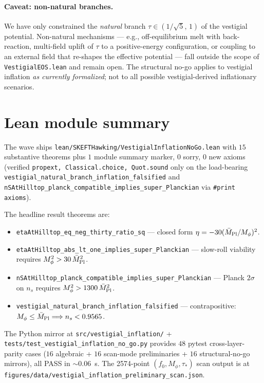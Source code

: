 \documentclass[twocolumn]{revtex4-2}
\newcommand{\Mpl}{\bar M_{\rm Pl}}
\newcommand{\Mphi}{M_\phi}
\newcommand{\fzero}{f_0}
\newcommand{\nS}{n_s}
\begin{document}
\paragraph{Caveat: non-natural branches.} We have only constrained the
\emph{natural} branch $\tau\in(1/\sqrt{5},\,1)$ of the vestigial
potential. Non-natural mechanisms — e.g., off-equilibrium melt with
back-reaction, multi-field uplift of $\tau$ to a positive-energy
configuration, or coupling to an external field that re-shapes the
effective potential — fall outside the scope of \texttt{VestigialEOS.lean}
and remain open. The structural no-go applies to vestigial inflation
\emph{as currently formalized}; not to all possible
vestigial-derived inflationary scenarios.

\section{Lean module summary}
\label{sec:lean}

The wave ships \texttt{lean/SKEFTHawking/VestigialInflationNoGo.lean}
with $15$ substantive theorems plus $1$ module summary marker, $0$
sorry, $0$ new axioms (verified \texttt{propext, Classical.choice,
Quot.sound} only on the load-bearing
\texttt{vestigial\_natural\_branch\_inflation\_falsified} and
\texttt{nSAtHilltop\_planck\_compatible\_implies\_super\_Planckian}
via \texttt{\#print axioms}).

The headline result theorems are:
\begin{itemize}
\item \texttt{etaAtHilltop\_eq\_neg\_thirty\_ratio\_sq} — closed form
   $\eta = -30(\Mpl/\Mphi)^2$.
\item \texttt{etaAtHilltop\_abs\_lt\_one\_implies\_super\_Planckian} —
   slow-roll viability requires $\Mphi^2 > 30\,\Mpl^2$.
\item \texttt{nSAtHilltop\_planck\_compatible\_implies\_super\_Planckian} —
   Planck $2\sigma$ on $\nS$ requires $\Mphi^2 > 1300\,\Mpl^2$.
\item \texttt{vestigial\_natural\_branch\_inflation\_falsified} —
   contrapositive: $\Mphi \le \Mpl \Longrightarrow \nS < 0.9565$.
\end{itemize}

The Python mirror at \texttt{src/vestigial\_inflation/} +
\texttt{tests/test\_vestigial\_inflation\_no\_go.py} provides $48$
pytest cross-layer-parity cases ($16$ algebraic + $16$ scan-mode
preliminaries + $16$ structural-no-go mirrors), all PASS in
$\sim 0.06$~s. The 2574-point $(\fzero,\Mphi,\tau_*)$ scan output is at
\texttt{figures/data/vestigial\_inflation\_preliminary\_scan.json}.
\end{document}
